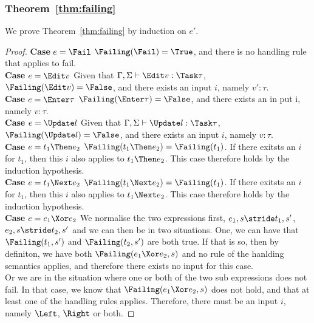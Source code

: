 \subsubsection{Theorem~\ref{thm:failing}}

We prove Theorem~\ref{thm:failing} by induction on $e'$.

\begin{proof}

  \noindent\textbf{Case} $e = \Fail$ $\Failing(\Fail)=\True$, and there is no handling rule that applies to fail.\\

  \noindent\textbf{Case} $e = \Edit v$ Given that $\Gamma,\Sigma\infers\Edit v:\Task\tau$, $\Failing(\Edit v)=\False$, and there exists an input $i$, namely $v':\tau$.\\

  \noindent\textbf{Case} $e = \Enter \tau$ $\Failing(\Enter \tau)=\False$, and there exists an in put i, namely $v:\tau$.\\

  \noindent\textbf{Case} $e = \Update l$ Given that $\Gamma,\Sigma\infers\Update l:\Task\tau$, $\Failing(\Update l)=\False$, and there exists an input $i$, namely $v:\tau$.\\

  \noindent\textbf{Case} $e = t_1\Then e_2$ $\Failing(t_1\Then e_2)=\Failing(t_1)$. If there exitsts an $i$ for $t_1$, then this $i$ also applies to $t_1\Then e_2$. This case therefore holds by the induction hypothesis.\\

  \noindent\textbf{Case} $e = t_1\Next e_2$ $\Failing(t_1\Next e_2)=\Failing(t_1)$. If there exitsts an $i$ for $t_1$, then this $i$ also applies to $t_1\Next e_2$. This case therefore holds by the induction hypothesis.\\

  \noindent\textbf{Case} $e = e_1\Xor e_2$ We normalise the two expressions first, $e_1,s\stride t_1,s'$, $e_2,s\stride t_2,s'$ and we can then be in two situations. One, we can have that $\Failing(t_1,s')$ and $\Failing(t_2,s')$ are both true. If that is so, then by definiton, we have both $\Failing(e_1\Xor e_2,s)$ and no rule of the hanlding semantics applies, and therefore there exists no input for this case.\\
                                           Or we are in the situation where one or both of the two sub expressions does not fail. In that case, we know that $\Failing(e_1\Xor e_2,s)$ does not hold, and that at least one of the handling rules applies. Therefore, there must be an input $i$, namely $\Left$, $\Right$ or both.


\end{proof}
